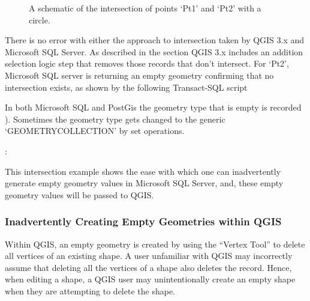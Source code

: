 \documentclass[letterpaper,10pt,english]{sphinxmanual}
\begin{document}
\begin{figure}[htbp]
\centering
\capstart

\noindent{}
\caption{A schematic of the intersection of points ‘Pt1’ and ‘Pt2’ with a circle.}\label{\detokenize{concept:id61}}\label{\detokenize{concept:figurevi}}\end{figure}

There is no error with either the approach to intersection taken by QGIS 3.x and Microsoft SQL Server.  As described in the section  QGIS 3.x includes an addition selection logic step that removes those records that don’t intersect.  For ‘Pt2’, Microsoft SQL server is returning an empty geometry confirming that no intersection exists, as shown by the following Transact-SQL script %
\begin{footnote}[2]\sphinxAtStartFootnote
In both Microsoft SQL and PostGis the geometry type that is empty is recorded ).  Sometimes the geometry type gets changed to the generic ‘GEOMETRYCOLLECTION’ by set operations.
%
\end{footnote}:

%
\begin{sphinxVerbatim}[commandchars=\\\{\}]
    
    
 
 
\end{sphinxVerbatim}

This intersection example shows the ease with which one can inadvertently generate empty geometry values in Microsoft SQL Server, and, these empty geometry values will be passed to QGIS.


\subsubsection{Inadvertently Creating Empty Geometries within QGIS}
\label{\detokenize{concept:inadvertently-creating-empty-geometries-within-qgis}}
Within QGIS, an empty geometry is created by using the “Vertex Tool” to delete all vertices of an existing shape.  A user unfamiliar with QGIS may incorrectly assume that deleting all the vertices of a shape also deletes the record.  Hence, when editing a shape, a QGIS user may unintentionally create an empty shape when they are attempting to delete the shape.
\end{document}
